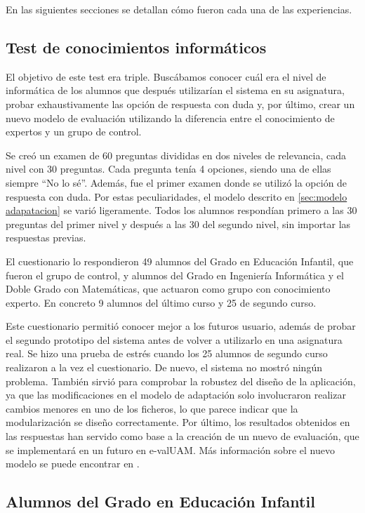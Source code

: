En las siguientes secciones se detallan cómo fueron cada una de las experiencias.

\subsection{Test de conocimientos informáticos}

El objetivo de este test era triple. Buscábamos conocer cuál era el nivel de informática de los alumnos que después utilizarían el sistema en su asignatura, probar exhaustivamente las opción de respuesta con duda y, por último, crear un nuevo modelo de evaluación utilizando la diferencia entre el conocimiento de expertos y un grupo de control.

Se creó un examen de 60 preguntas divididas en dos niveles de relevancia, cada nivel con 30 preguntas. Cada pregunta tenía 4 opciones, siendo una de ellas siempre ``No lo sé''. Además, fue el primer examen donde se utilizó la opción de respuesta con duda. Por estas peculiaridades, el modelo descrito en \ref{sec:modelo adapatacion} se varió ligeramente. Todos los alumnos respondían primero a las 30 preguntas del primer nivel y después a las 30 del segundo nivel, sin importar las respuestas previas.

El cuestionario lo respondieron 49 alumnos del Grado en Educación Infantil, que fueron el grupo de control, y alumnos del Grado en Ingeniería Informática y el Doble Grado con Matemáticas, que actuaron como grupo con conocimiento experto. En concreto 9 alumnos del último curso y 25 de segundo curso.

Este cuestionario permitió conocer mejor a los futuros usuario, además de probar el segundo prototipo del sistema antes de volver a utilizarlo en una asignatura real. Se hizo una prueba de estrés cuando los 25 alumnos de segundo curso realizaron a la vez el cuestionario. De nuevo, el sistema no mostró ningún problema. También sirvió para comprobar la robustez del diseño de la aplicación, ya que las modificaciones en el modelo de adaptación solo involucraron realizar cambios menores en uno de los ficheros, lo que parece indicar que la modularización se diseño correctamente. Por último, los resultados obtenidos en las respuestas han servido como base a la creación de un nuevo de evaluación, que se implementará en un futuro en \acrshort{e-valUAM}. Más información sobre el nuevo modelo se puede encontrar en \cite{Molins15}.

\subsection{Alumnos del Grado en Educación Infantil}

